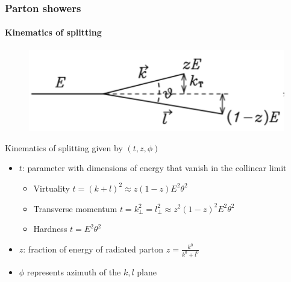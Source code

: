 \documentclass[aspectratio=43]{beamer}
\begin{document}
\begin{frame}

	\frametitle{Parton showers}
	\framesubtitle{Kinematics of splitting}
	
	\begin{figure}
		\includegraphics[width = 5 cm]{plots/shower_kinematics.png}
	\end{figure}
	
	\footnotesize Kinematics of splitting given by $(t, z, \phi)$
	\begin{itemize}
		\item $t$: parameter with dimensions of energy that vanish in the collinear limit \\
		\begin{itemize}
			\item Virtuality $t = (k + l)^{2} \approx z(1 - z)E^{2}\theta^{2}$
			\item Transverse momentum $t = k_{\perp}^{2} = l_{\perp}^{2} \approx z^{2}(1 - z)^{2}E^{2}\theta^{2}$
			\item Hardness $t = E^{2}\theta^{2}$
		\end{itemize}
		\item $z$: fraction of energy of radiated parton $z = \frac{k^{0}}{k^{0} + l^{0}}$
		\item $\phi$ represents azimuth of the $k, l$ plane
	\end{itemize}
	
\end{frame}
\end{document}
